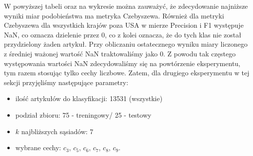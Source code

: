 \documentclass{classrep}
\begin{document}
W powyższej tabeli oraz na wykresie można zauważyć, że zdecydowanie najniższe wyniki miar podobieństwa ma metryka Czebyszewa. Również dla metryki Czebyszewa dla wszystkich krajów poza USA w mierze Precision i F1 występuje NaN, co oznacza dzielenie przez 0, co z kolei oznacza, że do tych klas nie został przydzielony żaden artykuł. Przy obliczaniu ostatecznego wyniku miary liczonego z średniej ważonej wartość NaN traktowaliśmy jako 0. Z powodu tak częstego występowania wartości NaN zdecydowaliśmy się na powtórzenie eksperymentu, tym razem stosując tylko cechy liczbowe.
Zatem, dla drugiego eksperymentu w tej sekcji przyjęliśmy następujące parametry:
\begin{itemize}
    \item ilość artykułów do klasyfikacji: 13531 (wszystkie)
    \item podział zbioru: 75 - treningowy/ 25 - testowy
    \item $k$ najbliższych sąsiadów: 7
    \item wybrane cechy: $c_3$, $c_5$, $c_6$, $c_7$, $c_8$, $c_9$.
\end{itemize}

\end{document}
